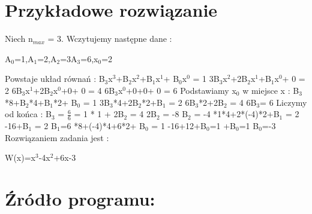 \documentclass[11pt]{article}
\begin{document}
\section{Przykładowe rozwiązanie}
Niech n$_{max}$ = 3. Wczytujemy następne dane : \newline
\centerline{A$_{0}$=1,A$_{1}$=2,A$_{2}$=3A$_{3}$=6,x$_{0}$=2}
\newline \newline Powstaje układ równań : \newline 
B$_{3}$x$^{3}$+B$_{2}$x$^{2}$+B$_{1}$x$^{1}$+ B$_{0}$x$^{0}$ = 1 \newline
3B$_{3}$x$^{2}$+2B$_{2}$x$^{1}$+B$_{1}$x$^{0}$+ 0 = 2 \newline 
6B$_{3}$x$^{1}$+2B$_{2}$x$^{0}$+0+ 0 = 4 \newline
6B$_{3}$x$^{0}$+0+0+ 0 = 6 \newline \newline 
Podstawiamy x$_{0}$ w miejsce x : \newline
B$_{3}$*8+B$_{2}$*4+B$_{1}$*2+ B$_{0}$ = 1 \newline
3B$_{3}$*4+2B$_{2}$*2+B$_{1}$ = 2 \newline 
6B$_{3}$*2+2B$_{2}$ = 4 \newline
6B$_{3}$= 6 \newline \newline 
Liczymy od końca : \newline
B$_{3}$ = $\frac {6}{6}$ = 1  * 1 + 2B$_{2}$ = 4 \newline
2B$_{2}$ = -8 \newline
B$_{2}$ = -4 *1*4+2*(-4)*2+B$_{1}$ = 2 -16+B$_{1}$ = 2 \newline
B$_{1}$=6 *8+(-4)*4+6*2+ B$_{0}$ = 1 -16+12+B$_{0}$=1 +B$_{0}$=1 \newline
B$_{0}$=-3 \newline
\newline
Rozwiązaniem zadania jest : \newline
\centerline {W(x)=x$^{3}$-4x$^{2}$+6x-3}

\clearpage

\section{Źródło programu:}
\end{document}
